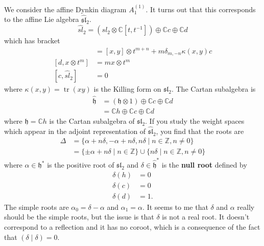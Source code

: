 \documentclass[12pt]{article}
\begin{document}
\begin{example}
    [Affine $\sl_2$] We consider the affine Dynkin diagram $A_1^{(1)}$. It turns out that this corresponds to the affine Lie algebra $\widehat{\mathfrak{sl}}_2$.
    \[\widehat{sl}_2 = (sl_2\otimes\mathbb C[t,t^{-1}]) \oplus \mathbb Cc \oplus \mathbb Cd\] which has bracket \begin{align*}
        [x\otimes t^m, y\otimes t^n] & = [x,y]\otimes t^{m+n} + m\delta_{m,-n}\kappa(x,y)c \\
        [d, x\otimes t^m]            & = m x\otimes t^m                                    \\
        [c, \widehat{sl}_2]          & = 0
    \end{align*} where $\kappa(x,y) = \operatorname{tr}(xy)$ is the Killing form on $\mathfrak{sl}_2$. The Cartan subalgebra is \begin{align*}
        \widehat{\mathfrak{h}} & = (\mathfrak{h}\otimes 1) \oplus \mathbb{C}c \oplus \mathbb{C}d \\
                               & = \mathbb{C}h \oplus \mathbb{C}c \oplus \mathbb{C}d
    \end{align*} where $\mathfrak{h} = \mathbb{C}h$ is the Cartan subalgebra of $\mathfrak{sl}_2$. If you study the weight spaces which appear in the adjoint representation of $\widehat{\mathfrak{sl}}_2$, you find that the roots are \begin{align*}
        \Delta & = \{\alpha + n\delta, -\alpha + n\delta, n\delta \mid n \in \mathbb{Z}, n \neq 0\}                \\
               & = \{\pm \alpha + n\delta \mid n \in \mathbb{Z}\} \cup \{n\delta \mid n \in \mathbb{Z}, n \neq 0\}
    \end{align*} where $\alpha \in \mathfrak{h}^*$ is the positive root of $\mathfrak{sl}_2$ and $\delta \in \widehat{\mathfrak{h}}^*$ is the \textbf{null root} defined by \begin{align*}
        \delta(h) & = 0  \\
        \delta(c) & = 0  \\
        \delta(d) & = 1.
    \end{align*} The simple roots are $\alpha_0 = \delta - \alpha$ and $\alpha_1 = \alpha$. It seems to me that $\delta$ and $\alpha$ really should be the simple roots, but the issue is that $\delta$ is not a real root. It doesn't correspond to a reflection and it has no coroot, which is a consequence of the fact that $(\delta \mid \delta) = 0$.


\end{example}
\end{document}

